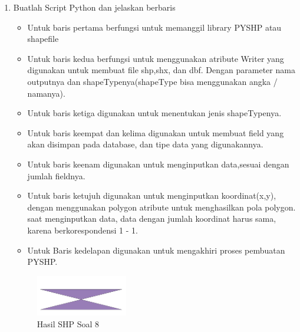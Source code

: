 \begin{enumerate}
	\item Buatlah Script Python dan jelaskan berbaris
	
	\begin{itemize}
		\item Untuk baris pertama berfungsi untuk memanggil library PYSHP atau shapefile
		\item Untuk baris kedua berfungsi untuk menggunakan atribute Writer yang digunakan untuk membuat file shp,shx, dan dbf. \hfill\break Dengan parameter nama outputnya dan shapeTypenya(shapeType bisa menggunakan angka / namanya).
		\item Untuk baris ketiga digunakan untuk menentukan jenis shapeTypenya.
		\item Untuk baris keempat dan kelima digunakan untuk membuat field yang akan disimpan pada database, dan tipe data yang digunakannya.
		\item Untuk baris keenam digunakan untuk menginputkan data,sesuai dengan jumlah fieldnya.
		\item Untuk baris ketujuh digunakan untuk menginputkan koordinat(x,y), dengan menggunakan polygon atribute untuk menghasilkan pola polygon. \hfill\break
		saat menginputkan data, data dengan jumlah koordinat harus sama, karena berkorespondensi 1 - 1.
		\item Untuk Baris kedelapan digunakan untuk mengakhiri proses pembuatan PYSHP.
	\end{itemize}
	\hfill\break
	\begin{figure}[H]
		\includegraphics[width=4cm]{figures/1174027/2/soal8.png}
		\centering
		\caption{Hasil SHP Soal 8}
	\end{figure}


\end{enumerate}
